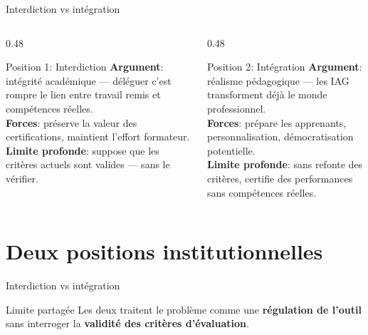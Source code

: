 \begin{frame}{Interdiction vs intégration}
  \begin{columns}[T]
    \begin{column}{0.48\textwidth}
      \begin{block}{Position 1: Interdiction}
        \textbf{Argument}: intégrité académique ---
        déléguer c'est rompre le lien entre
        travail remis et compétences réelles.\\[0.4em]
        \textbf{Forces}: préserve la valeur
        des certifications, maintient l'effort
        formateur.\\[0.4em]
        \textbf{Limite profonde}: suppose que
        les critères actuels sont valides ---
        sans le vérifier.
      \end{block}
    \end{column}
    \begin{column}{0.48\textwidth}
      \begin{block}{Position 2: Intégration}
        \textbf{Argument}: réalisme pédagogique ---
        les IAG transforment déjà le monde
        professionnel.\\[0.4em]
        \textbf{Forces}: prépare les apprenants,
        personnalisation, démocratisation
        potentielle.\\[0.4em]
        \textbf{Limite profonde}: sans refonte
        des critères, certifie des performances
        sans compétences réelles.
      \end{block}
    \end{column}
  \end{columns}
\end{frame}

\section{Deux positions institutionnelles}

\begin{frame}{Interdiction vs intégration}
  \begin{alertblock}{Limite partagée}
    Les deux traitent le problème comme une \textbf{régulation de l'outil}
    sans interroger la \textbf{validité des critères d'évaluation}.
  \end{alertblock}
\end{frame}

